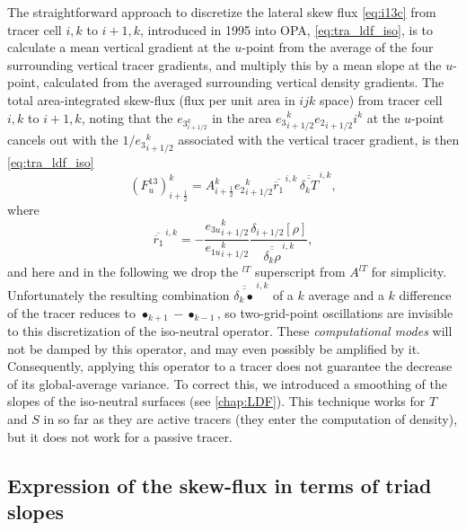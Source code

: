 \documentclass[../main/NEMO_manual]{subfiles}
\begin{document}
The straightforward approach to discretize the lateral skew flux
\autoref{eq:i13c} from tracer cell $i,k$ to $i+1,k$, introduced in 1995 into OPA,
\autoref{eq:tra_ldf_iso}, is to calculate a mean vertical gradient at the $u$-point from
the average of the four surrounding vertical tracer gradients, and multiply this by a mean slope at the $u$-point,
calculated from the averaged surrounding vertical density gradients.
The total area-integrated skew-flux (flux per unit area in $ijk$ space) from tracer cell $i,k$ to $i+1,k$,
noting that the $e_{{3}_{i+1/2}^k}$ in the area $e{_{3}}_{i+1/2}^k{e_{2}}_{i+1/2}i^k$ at the $u$-point cancels out with
the $1/{e_{3}}_{i+1/2}^k$ associated with the vertical tracer gradient, is then \autoref{eq:tra_ldf_iso}
\[
  \left(F_u^{13} \right)_{i+\frac{1}{2}}^k = {A}_{i+\frac{1}{2}}^k
  {e_{2}}_{i+1/2}^k \overline{\overline
    r_1} ^{\,i,k}\,\overline{\overline{\delta_k T}}^{\,i,k},
\]
where
\[
  \overline{\overline
    r_1} ^{\,i,k} = -\frac{{e_{3u}}_{i+1/2}^k}{{e_{1u}}_{i+1/2}^k}
  \frac{\delta_{i+1/2} [\rho]}{\overline{\overline{\delta_k \rho}}^{\,i,k}},
\]
and here and in the following we drop the $^{lT}$ superscript from ${A^{lT}}$ for simplicity.
Unfortunately the resulting combination $\overline{\overline{\delta_k\bullet}}^{\,i,k}$ of a $k$ average and
a $k$ difference of the tracer reduces to $\bullet_{k+1}-\bullet_{k-1}$,
so two-grid-point oscillations are invisible to this discretization of the iso-neutral operator.
These \emph{computational modes} will not be damped by this operator, and may even possibly be amplified by it.
Consequently, applying this operator to a tracer does not guarantee the decrease of its global-average variance.
To correct this, we introduced a smoothing of the slopes of the iso-neutral surfaces (see \autoref{chap:LDF}).
This technique works for $T$ and $S$ in so far as they are active tracers
(\ie they enter the computation of density), but it does not work for a passive tracer.

\subsection{Expression of the skew-flux in terms of triad slopes}
\end{document}
